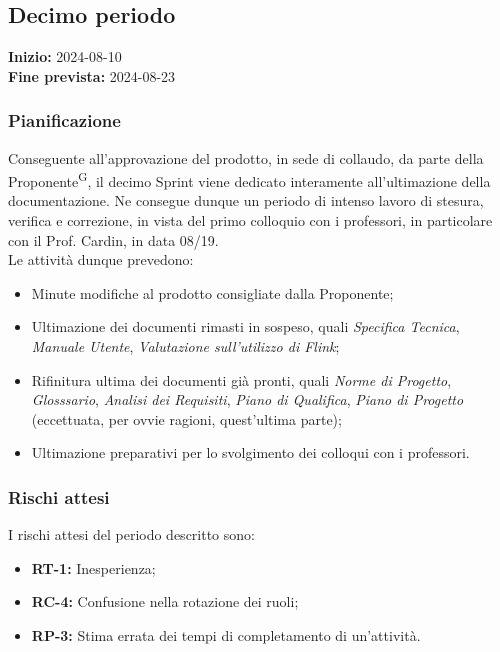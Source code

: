 \documentclass[8pt]{article}
\newcommand{\glossterm}[1]{#1\textsuperscript{G}} %
\begin{document}
\subsection{Decimo periodo}
\textbf{Inizio:} 2024-08-10\\
\textbf{Fine prevista:} 2024-08-23
\subsubsection{Pianificazione}
Conseguente all'approvazione del prodotto, in sede di collaudo, da parte della \glossterm{Proponente}, il decimo Sprint viene dedicato interamente all'ultimazione della documentazione. Ne consegue dunque un periodo di intenso lavoro di stesura, verifica e correzione, in vista del primo colloquio con i professori, in particolare con il Prof. Cardin, in data 08/19.\\Le attività dunque prevedono:
\begin{itemize}
    \item Minute modifiche al prodotto consigliate dalla Proponente;
    \item Ultimazione dei documenti rimasti in sospeso, quali \textit{Specifica Tecnica}, \textit{Manuale Utente}, \textit{Valutazione sull'utilizzo di Flink};
    \item Rifinitura ultima dei documenti già pronti, quali \textit{Norme di Progetto}, \textit{Glosssario}, \textit{Analisi dei Requisiti}, \textit{Piano di Qualifica}, \textit{Piano di Progetto} (eccettuata, per ovvie ragioni, quest'ultima parte);
    \item Ultimazione preparativi per lo svolgimento dei colloqui con i professori.
\end{itemize} 
\subsubsection{Rischi attesi}
I rischi attesi del periodo descritto sono:
\begin{itemize}
    \setlength\itemsep{0em}
        \item \textbf{RT-1:} Inesperienza;
        \item \textbf{RC-4:} Confusione nella rotazione dei ruoli;
        \item \textbf{RP-3:} Stima errata dei tempi di completamento di un'attività.
    \end{itemize}
\clearpage
\end{document}
